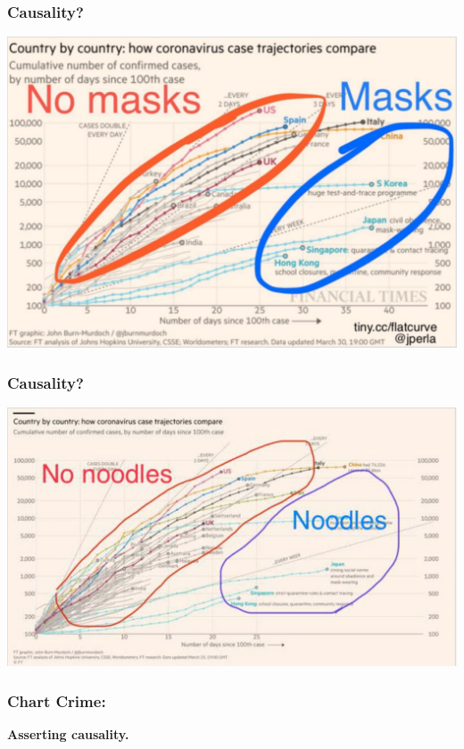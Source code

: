 \documentclass[aspectratio=169]{beamer}
\theoremstyle{principle}
\begin{document}
\begin{frame}
\frametitle{Causality?}
\begin{center}
\includegraphics[scale=0.4]{misleading_causal_claim_1.png}
\end{center}

\end{frame}

\begin{frame}
\frametitle{Causality?}
\begin{center}
\includegraphics[scale=0.5]{misleading_causal_claim_2.png}
\end{center}

\end{frame}

\begin{frame}
\frametitle{Chart Crime:}

\begin{center}
\huge \textbf{Asserting causality.}
\end{center}

\end{frame}
\end{document}
